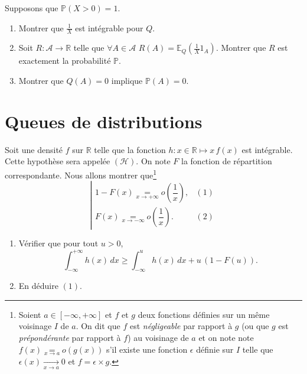 \label{I-mes-proba4}
Supposons que \(\mathbb{P}(X > 0) = 1\).

\begin{enumerate}
\def\labelenumi{\roman{enumi})}
\item
  Montrer que \(\frac{1}{X}\) est intégrable pour \(Q\).
\item
  Soit \(R : \mathcal{A}\to \mathbb{R}\) telle que
  \(\forall A \in \mathcal{A}\,\, R(A) = \mathbb{E}_Q(\frac{1}{X}1_A)\).
  Montrer que \(R\) est exactement la probabilité \(\mathbb{P}\).
\item
  Montrer que \(Q(A) = 0\) implique \(\mathbb{P}(A) = 0\).
\end{enumerate}


\section{Queues de distributions}\label{I-queues-de-distributions}

Soit une densité \(f\) sur \(\mathbb{R}\) telle que la fonction
\(h: x \in \mathbb{R}\mapsto x\,f(x)\) est intégrable. Cette hypothèse
sera appelée \((\mathcal{H})\). On note \(F\) la fonction de répartition
correspondante. Nous allons montrer que\footnote{Soient
  \(a \in [-\infty,+\infty]\) et \(f\) et \(g\) deux fonctions définies
  sur un même voisinage \(I\) de \(a\). On dit que \(f\) est
  \emph{négligeable} par rapport à \(g\) (ou que \(g\) est
  \emph{prépondérante} par rapport à \(f\)) au voisinage de \(a\) et on
  note note \(f(x) \underset{x\to a}{=} o(g(x))\) s'il existe une
  fonction \(\epsilon\) définie sur \(I\) telle que
  \(\epsilon(x) \xrightarrow[x\to a]{} 0\) et \(f = \epsilon \times g\).}
\[\left|\begin{array}{rl} 1-F(x) \underset{x\to+\infty}{=} o\left(\dfrac{1}{x}\right), & (1)\\[1em] F(x) \underset{x\to-\infty}{=} o\left(\dfrac{1}{x}\right).& (2) \end{array} \right. \]

\label{I-dlfdr-pi}

\begin{enumerate}
\def\labelenumi{\arabic{enumi}.}
\item
  Vérifier que pour tout \(u > 0\),
  \[\int_{-\infty}^{+\infty} h(x)\,dx \geq \int_{-\infty}^u h(x)\,dx + u\,\left(1-F(u)\right).\]
\item
  En déduire \((1)\).
\end{enumerate}

